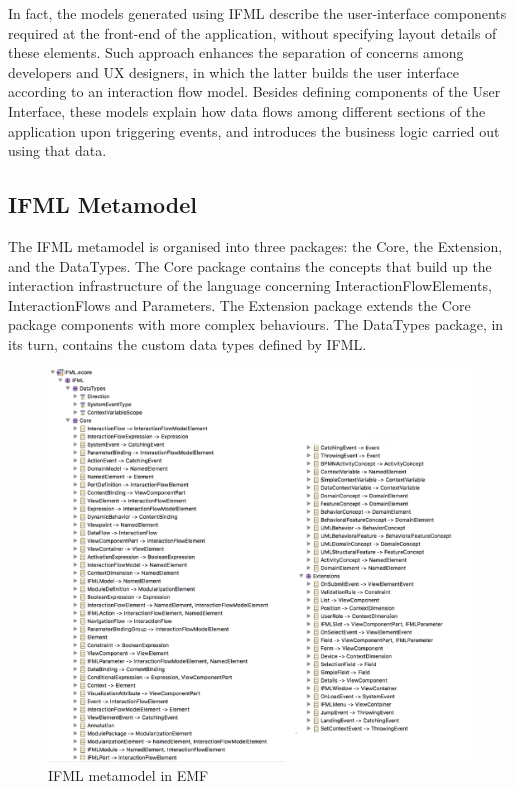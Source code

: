 In fact, the models generated using IFML describe the user-interface components required at the front-end of the application, without specifying layout details of these elements. Such approach enhances the separation of concerns among developers and UX designers, in which the latter builds the user interface according to an interaction flow model. Besides defining components of the User Interface, these models explain how data flows among different sections of the application upon triggering events, and introduces the business logic carried out using that data.

\subsection{IFML Metamodel}

The IFML metamodel is organised into three packages: the Core, the Extension, and the DataTypes. The Core package contains the concepts that build up the interaction infrastructure of the language concerning InteractionFlowElements, InteractionFlows and Parameters. The Extension package extends the Core package components with more complex behaviours. The DataTypes package, in its turn, contains the custom data types defined by IFML.

\vspace{0.5cm}
\begin{figure}[H]
  \centering
    \includegraphics[width=16cm]{images/diagrams/ifml-ecore.png}
  \caption{IFML metamodel in EMF}
  \label{fig:ifml-ecore-representation}
\end{figure}
\vspace{0.5cm}

